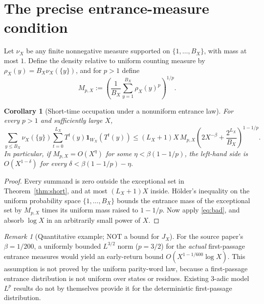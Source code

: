 \documentclass[11pt]{amsart}
\newtheorem{corollary}{Corollary}
\theoremstyle{remark}\newtheorem{remark}{Remark}
\newcommand{\one}{\mathbf 1}
\begin{document}
\section{The precise entrance-measure condition}
Let $\nu_X$ be any finite nonnegative measure supported on $\{1,\ldots,B_X\}$, with mass at most $1$.  Define the density relative to uniform counting measure by $\rho_X(y)=B_X\nu_X(\{y\})$, and for $p>1$ define
\[
 M_{p,X}:=\left(\frac1{B_X}\sum_{y=1}^{B_X}\rho_X(y)^p\right)^{1/p}.
\]
\begin{corollary}[Short-time occupation under a nonuniform entrance law]\label{cor:entry}
For every $p>1$ and sufficiently large $X$,
\begin{equation}\label{eq:entry}
 \sum_{y\le B_X}\nu_X(\{y\})\sum_{t=0}^{L_X}T^t(y)\one_{W_X}(T^t(y))
 \le (L_X+1)X\,M_{p,X}\left(2X^{-\beta}+\frac{2^{L_X}}{B_X}\right)^{1-1/p}.
\end{equation}
In particular, if $M_{p,X}=O(X^\eta)$ for some $\eta<\beta(1-1/p)$, the left-hand side is $O(X^{1-\delta})$ for every $\delta<\beta(1-1/p)-\eta$.
\end{corollary}
\begin{proof}
Every summand is zero outside the exceptional set in Theorem~\ref{thm:short}, and at most $(L_X+1)X$ inside.  H\"older's inequality on the uniform probability space $\{1,\ldots,B_X\}$ bounds the entrance mass of the exceptional set by $M_{p,X}$ times its uniform mass raised to $1-1/p$.  Now apply \eqref{eq:bad}, and absorb $\log X$ in an arbitrarily small power of $X$.
\end{proof}
\begin{remark}[Quantitative example; NOT a bound for $J_X$]
For the source paper's $\beta=1/200$, a uniformly bounded $L^{3/2}$ norm ($p=3/2$) for the \emph{actual} first-passage entrance measures would yield an early-return bound $O(X^{1-1/600}\log X)$. This assumption is not proved by the uniform parity-word law, because a first-passage entrance distribution is not uniform over states or residues.  Existing $3$-adic model $L^p$ results do not by themselves provide it for the deterministic first-passage distribution.
\end{remark}
\end{document}

